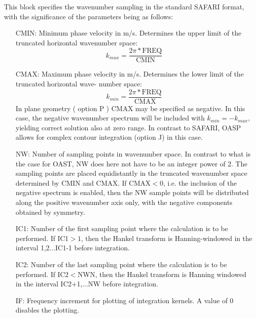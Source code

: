 This block specifies the wavenumber sampling in the standard SAFARI
format, with the significance of the parameters being as follows:
\begin{itemize}
		\item[CMIN:]   Minimum phase velocity in m/s. Determines the
		upper limit of the truncated horizontal wavenumber space:
			\begin{displaymath}
			k_{max} = \frac{2\pi \ast \mbox{FREQ}}{\mbox{CMIN}}
			\end{displaymath}
		\item[CMAX:]	Maximum phase velocity in m/s. Determines the
		lower limit of the truncated horizontal wave-
		number space:
			\begin{displaymath}
			k_{min} = \frac{2\pi \ast \mbox{FREQ}}{\mbox{CMAX}}
			\end{displaymath}
		In plane geometry ( option P ) CMAX may be specified as 
		negative. In this case, the negative wavenumber spectrum
		will be included with $k_{min}=-k_{max}$, yielding correct 
		solution also at zero range. In contrast to SAFARI,
		OASP allows for complex contour integration (option J)
		in this case.
		\item[NW:]	Number of sampling points in wavenumber space.
		In contrast to what is the case for OAST, 
		NW does here not have to be an integer  power of 2.				The sampling points are placed equidistantly
		in the truncated wavenumber space determined
		by CMIN and CMAX. If CMAX$<0$, i.e. the inclusion of
		the negative spectrum is enabled, then the NW sample
		points will be distributed along the positive
		wavenumber axis only, with the negative
		components obtained by symmetry.

		\item[IC1:]  Number of the first sampling point where the
		calculation is to be performed. If IC1$>1$, 
		then the Hankel transform is Hanning-windowed in the
		interval 1,2$\ldots$IC1-1 before integration.

		\item[IC2:]	Number of the last sampling point where the 
		calculation is to be performed. If IC2$<$NWN,
		then the Hankel transform is Hanning windowed in the
		interval IC2+1,$\ldots$NW before integration.

		\item[IF:] Frequency increment for plotting of
integration  kernels. A value of 0 disables the plotting.
		\end{itemize}
 



